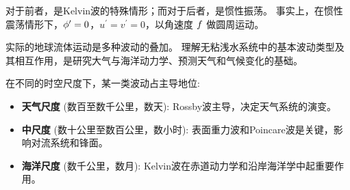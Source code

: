 对于前者，是Kelvin波的特殊情形；而对于后者，是惯性振荡。
事实上，在惯性震荡情形下，$\phi^\prime = 0$，$u^\prime = v^\prime = 0$，以角速度 $f$ 做圆周运动。

\begin{insightbox}[地球流体系统中的多尺度波动]
    实际的地球流体运动是多种波动的叠加。
    理解无粘浅水系统中的基本波动类型及其相互作用，是研究大气与海洋动力学、预测天气和气候变化的基础。

    在不同的时空尺度下，某一类波动占主导地位:
    \begin{itemize}
        \item \textbf{天气尺度} (数百至数千公里，数天): Rossby波主导，决定天气系统的演变。
        \item \textbf{中尺度} (数十公里至数百公里，数小时): 表面重力波和Poincare波是关键，影响对流系统和锋面。
        \item \textbf{海洋尺度} (数千公里，数月): Kelvin波在赤道动力学和沿岸海洋学中起重要作用。
    \end{itemize}
\end{insightbox}
